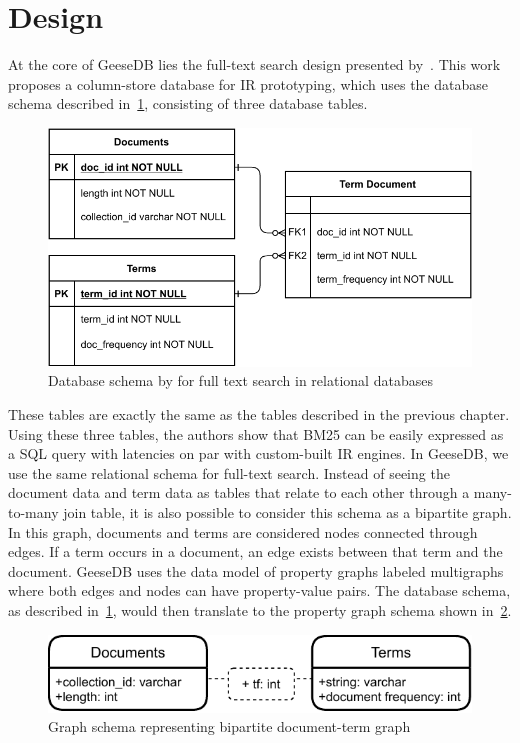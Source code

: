 \section{Design}
At the core of GeeseDB lies the full-text search design presented by~\citet{OldDog}. This work proposes a column-store database for IR prototyping, which uses the database schema described in~\cref{olddog_schema}, consisting of three database tables.
\begin{figure}
	\centering
	\includegraphics[width=\linewidth]{./imgs/olddog-schema-2.pdf}
	\caption{Database schema by \citeauthor{OldDog} for full text search in relational databases}
	\label{olddog_schema}
\end{figure}
These tables are exactly the same as the tables described in the previous chapter. Using these three tables, the authors show that BM25 can be easily expressed as a SQL query with latencies on par with custom-built IR engines. In GeeseDB, we use the same relational schema for full-text search.
Instead of seeing the document data and term data as tables that relate to each other through a many-to-many join table, it is also possible to consider this schema as a bipartite graph. In this graph, documents and terms are considered nodes connected through edges. If a term occurs in a document, an edge exists between that term and the document. GeeseDB uses the data model of property graphs labeled multigraphs where both edges and nodes can have property-value pairs. The database schema, as described in~\cref{olddog_schema}, would then translate to the property graph schema shown in~\cref{olddog-graph-schema}.
\begin{figure}
	\centering
	\includegraphics[width=\linewidth]{./imgs/olddog-graph-schema.pdf}
	\caption{Graph schema representing bipartite document-term graph}
	\label{olddog-graph-schema}
\end{figure}
